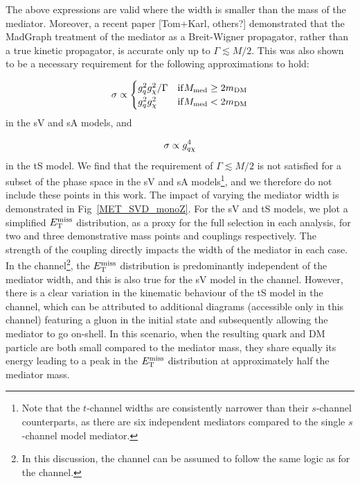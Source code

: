 The above expressions are valid where the width is smaller than the mass of the mediator. Moreover, a recent paper [Tom+Karl, others?] demonstrated that the MadGraph treatment of the mediator as a Breit-Wigner propagator, rather than a true kinetic propagator, is accurate only up to $\Gamma \lesssim M/2$. This was also shown to be a necessary requirement for the following approximations to hold:

\begin{equation}
  \sigma \propto
  \begin{cases}
      g_q^2 g_{\chi}^2 / \Gamma & \mathrm{ if } M_{\mathrm{med}} \geq 2 m_{\mathrm{DM}}\\
      g_q^2 g_{\chi}^2 & \mathrm{ if } M_{\mathrm{med}} < 2 m_{\mathrm{DM}}
  \end{cases}
  \label{eq:sigma_propto_couplings_schan}
\end{equation}
in the sV and sA models, and

\begin{equation}
  \sigma \propto g_{q \chi}^4
  \label{eq:sigma_propto_couplings_tchan}
\end{equation}
in the tS model. We find that the requirement of $\Gamma \lesssim M/2$ is not satisfied for a subset of the phase space in the sV and sA models\footnote{Note that the $t$-channel widths are consistently narrower than their $s$-channel counterparts,  as there are six independent mediators compared to the single $s$-channel model mediator.}, and we therefore do not include these points in this work.
The impact of varying the mediator width is demonstrated in Fig~\ref{MET_SVD_monoZ}. For the sV and tS models, we plot a simplified $E_{\mathrm{T}}^{\mathrm{miss}}$ distribution, as a proxy for the full selection in each analysis, for two and three demonstrative mass points and couplings respectively.  The strength of the coupling directly impacts the width of the mediator in each case. In the \monoZ channel\footnote{In this discussion, the \monoWZ channel can be assumed to follow the same logic as for the \monoZ channel.}, the $E_{\mathrm{T}}^{\mathrm{miss}}$ distribution is predominantly independent of the mediator width, and this is also true for the sV model in the \monojet channel. However, there is a clear variation in the kinematic behaviour of the tS model in the \monojet channel, which can be attributed to additional diagrams (accessible only in this channel) featuring a gluon in the initial state and subsequently allowing the mediator to go on-shell. In this scenario, when the resulting quark and DM particle are both small compared to the mediator mass, they share equally its energy leading to a peak in the $E_{\mathrm{T}}^{\mathrm{miss}}$ distribution at approximately half the mediator mass.

